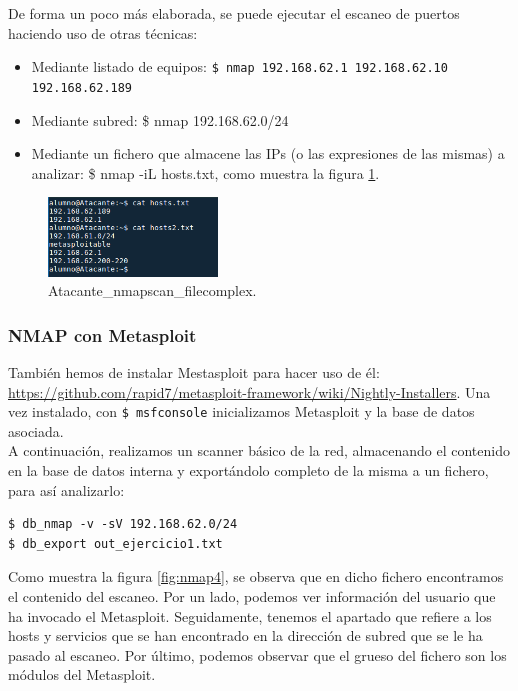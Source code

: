 \documentclass[a4,12pt,onecolum]{article}
\begin{document}
De forma un poco más elaborada, se puede ejecutar el escaneo de puertos haciendo uso de otras técnicas:

\begin{itemize}
  \item Mediante listado de equipos: \texttt{\$ nmap 192.168.62.1 192.168.62.10 192.168.62.189}
  \item Mediante subred: \$ nmap 192.168.62.0/24
  \item Mediante un fichero que almacene las IPs (o las expresiones de las mismas) a analizar: \$ nmap -iL hosts.txt, como muestra la figura \ref{fig:nmap3}.
\end{itemize}

\begin{figure}[htbp]
\centering
\includegraphics[width=0.4\textwidth]{./images/Atacante_nmapscan_filecomplex.png}
\caption{Atacante\_nmapscan\_filecomplex.}
\label{fig:nmap3}
\end{figure}

\subsubsection{NMAP con Metasploit}

También hemos de instalar Mestasploit para hacer uso de él: \url{https://github.com/rapid7/metasploit-framework/wiki/Nightly-Installers}. Una vez instalado, con \texttt{\$ msfconsole} inicializamos Metasploit y la base de datos asociada. \\

A continuación, realizamos un scanner básico de la red, almacenando el contenido en la base de datos interna y exportándolo completo de la misma a un fichero, para así analizarlo:

\begin{verbatim}
$ db_nmap -v -sV 192.168.62.0/24
$ db_export out_ejercicio1.txt
\end{verbatim}

Como muestra la figura \ref{fig:nmap4}, se observa que en dicho fichero encontramos el contenido del escaneo. Por un lado, podemos ver información del usuario que ha invocado el Metasploit. Seguidamente, tenemos el apartado que refiere a los hosts y servicios que se han encontrado en la dirección de subred que se le ha pasado al escaneo. Por último, podemos observar que el grueso del fichero son los módulos del Metasploit.
\end{document}
